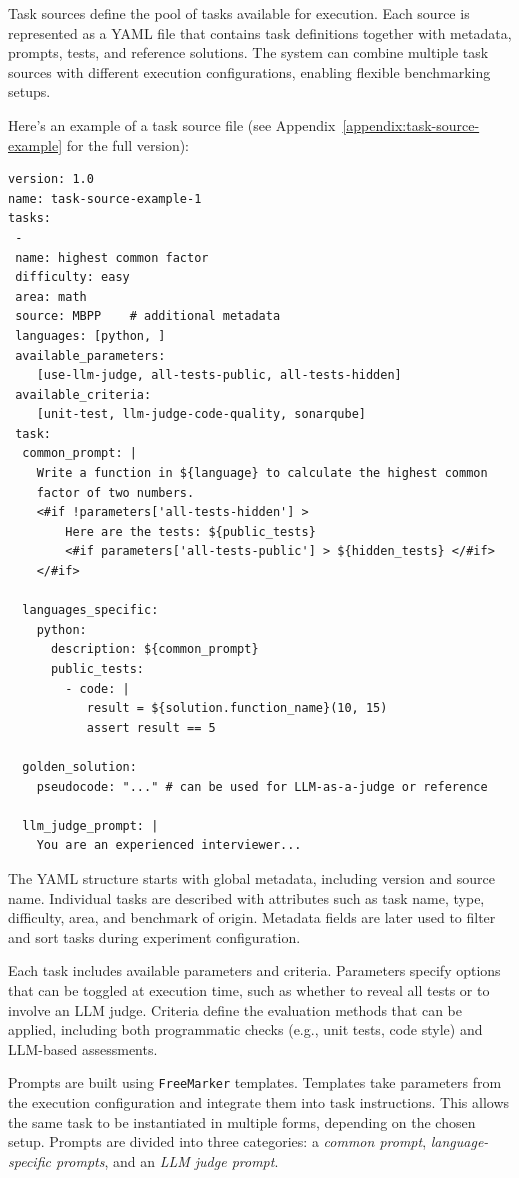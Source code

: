 Task sources define the pool of tasks available for execution.
Each source is represented as a YAML file that contains task definitions together with metadata, prompts, tests, and reference solutions.
The system can combine multiple task sources with different execution configurations, enabling flexible benchmarking setups.

Here's an example of a task source file (see Appendix~\ref{appendix:task-source-example} for the full version):

\begin{verbatim}
version: 1.0
name: task-source-example-1
tasks:
 -
 name: highest common factor
 difficulty: easy
 area: math
 source: MBPP    # additional metadata
 languages: [python, ]
 available_parameters:
    [use-llm-judge, all-tests-public, all-tests-hidden]
 available_criteria:
    [unit-test, llm-judge-code-quality, sonarqube]
 task:
  common_prompt: |
    Write a function in ${language} to calculate the highest common
    factor of two numbers.
    <#if !parameters['all-tests-hidden'] >
        Here are the tests: ${public_tests}
        <#if parameters['all-tests-public'] > ${hidden_tests} </#if>
    </#if>

  languages_specific:
    python:
      description: ${common_prompt}
      public_tests:
        - code: |
           result = ${solution.function_name}(10, 15)
           assert result == 5

  golden_solution:
    pseudocode: "..." # can be used for LLM-as-a-judge or reference

  llm_judge_prompt: |
    You are an experienced interviewer...
\end{verbatim}

The YAML structure starts with global metadata, including version and source name.
Individual tasks are described with attributes such as task name, type, difficulty, area, and benchmark of origin.
Metadata fields are later used to filter and sort tasks during experiment configuration.

Each task includes available parameters and criteria.
Parameters specify options that can be toggled at execution time, such as whether to reveal all tests or to involve an LLM judge.
Criteria define the evaluation methods that can be applied, including both programmatic checks (e.g., unit tests, code style) and LLM-based assessments.

Prompts are built using \texttt{FreeMarker} templates. Templates take parameters from the execution configuration and integrate them into task instructions.
This allows the same task to be instantiated in multiple forms, depending on the chosen setup.
Prompts are divided into three categories: a \emph{common prompt}, \emph{language-specific prompts}, and an \emph{LLM judge prompt}.

